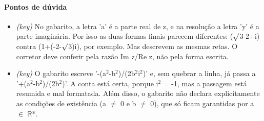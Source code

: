 \documentclass{article}%
\begin{document}
\paragraph{Pontos de dúvida}%
\begin{itemize}%
\item%
\textit{(key)} No gabarito, a letra 'a' é a parte real de z, e na resolução a letra 'y' é a parte imaginária. Por isso as duas formas finais parecem diferentes: ($\surd$3-2+i) contra (1+(-2-$\surd$3)i), por exemplo. Mas descrevem as mesmas retas. O corretor deve conferir pela razão Im z/Re z, não pela forma escrita.%
\item%
\textit{(key)} O gabarito escreve '-(a$^2$-b$^2$)/(2b$^2$i$^2$)' e, sem quebrar a linha, já passa a '+(a$^2$-b$^2$)/(2b$^2$)'. A conta está certa, porque i$^2$ = -1, mas a passagem está resumida e mal formatada. Além disso, o gabarito não declara explicitamente as condições de existência (a $\neq$ 0 e b $\neq$ 0), que só ficam garantidas por a $\in$ $\mathbb{R}$*.%
\end{itemize}%
\end{document}
